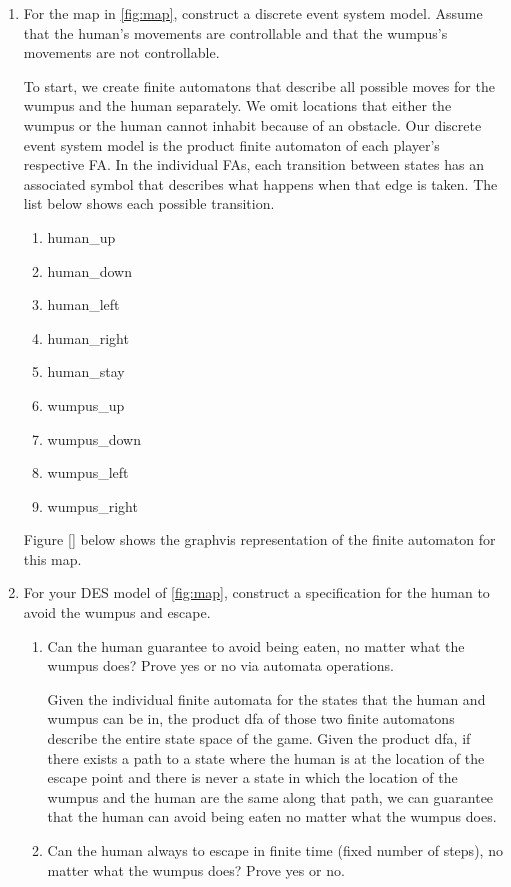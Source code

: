 \documentclass[12pt,letterpaper]{ntdhw}
\begin{document}
\begin{enumerate}

  \item For the map in \autoref{fig:map}, construct a discrete event
  system model.  Assume that the human's movements are controllable
  and that the wumpus's movements are not controllable.
  
To start, we create finite automatons that describe all possible moves for the wumpus and the human separately. We omit locations that either the wumpus or the human cannot inhabit because of an obstacle. Our discrete event system model is the product finite automaton of each player's respective FA. In the individual FAs, each transition between states has an associated symbol that describes what happens when that edge is taken. The list below shows each possible transition.
\begin{enumerate}
    \item human\_up
    \item human\_down
    \item human\_left
    \item human\_right
    \item human\_stay
    \item wumpus\_up
    \item wumpus\_down
    \item wumpus\_left
    \item wumpus\_right
    
\end{enumerate}Figure \ref{} below shows the graphvis representation of the finite automaton for this map.

  \item For your DES model of \autoref{fig:map}, construct a specification
  for the human to avoid the wumpus and escape.
  \begin{enumerate}
    \item Can the human guarantee to avoid being eaten, no matter what
    the wumpus does?  Prove yes or no via automata operations.
    
    Given the individual finite automata for the states that the human and wumpus can be in, the product dfa of those two finite automatons describe the entire state space of the game. Given the product dfa, if there exists a path to a state where the human is at the location of the escape point and there is never a state in which the location of the wumpus and the human are the same along that path, we can guarantee that the human can avoid being eaten no matter what the wumpus does.
    \item Can the human always to escape in finite time (fixed
    number of steps), no matter what the wumpus does?  Prove yes or
    no.


\end{enumerate}
\end{enumerate}
\end{document}
